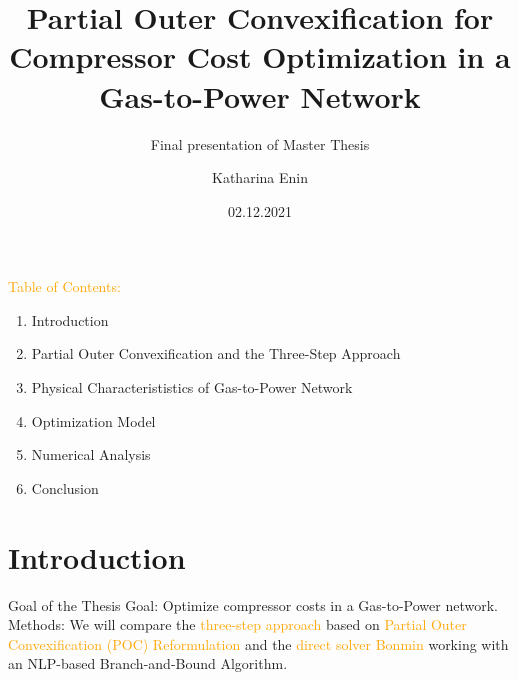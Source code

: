 \documentclass[8pt]{beamer}
\title{Partial Outer Convexification for Compressor Cost Optimization in a Gas-to-Power Network}
\subtitle{Final presentation of Master Thesis}
\institute 
{
Chair of Scientific Computing\\
University of Mannheim
}
\author{Katharina Enin}
\date{02.12.2021}
\begin{document}
\begin{frame}
	\titlepage 
\end{frame}
	
\begin{frame}
\textcolor{orange}{Table of Contents:}
\begin{enumerate}
\item  Introduction
\item Partial Outer Convexification and the Three-Step Approach
\item Physical Characterististics of Gas-to-Power Network
\item Optimization Model
\item Numerical Analysis
\item Conclusion
\end{enumerate}
\end{frame}

\section{Introduction}
\begin{frame}{Goal of the Thesis}
\textcolor{bluepurp}{Goal:} Optimize compressor costs in a Gas-to-Power network.  \newline\newline
\textcolor{bluepurp}{Methods:} We will compare the \textcolor{orange}{three-step approach} based on \textcolor{orange}{Partial Outer Convexification (POC) Reformulation} and the \textcolor{orange}{direct solver Bonmin} working with an NLP-based Branch-and-Bound Algorithm. 
\end{frame}
\end{document}
